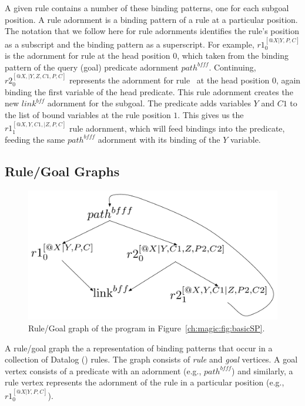 A given rule contains a number of these binding patterns, one for each subgoal
position.  A rule adornment is a binding pattern of a rule at a particular
position.  The notation that we follow here for rule adornments identifies the
rule's position as a subscript and the binding pattern as a superscript.  For
example, $r1_0^{[@X|Y,P,C]}$ is the adornment for rule  at the head
position $0$, which taken from the binding pattern of the query (goal)
predicate adornment $path^{bfff}$.  Continuing, $r2_0^{[@X,|Y,Z,C1,P,C]}$
represents the adornment for rule~ at the head position $0$, again
binding the first variable of the head predicate.  This rule adornment creates
the new $link^{bff}$ adornment for the  subgoal.  The 
predicate adds variables $Y$ and $C1$ to the list of bound variables at the
rule position $1$.  This gives us the $r1_1^{[@X,Y,C1,|Z,P,C]}$ rule adornment,
which will feed bindings into the  predicate, feeding the same
$path^{bfff}$ adornment with its binding of the $Y$ variable.

\subsection{Rule/Goal Graphs}

\begin{figure}[!t]
\begin{center}
\includegraphics[scale=0.5]{figures/RuleGoalGraph}
\caption{\label{ch:magic:fig:rggraph}Rule/Goal graph of the program in Figure~\ref{ch:magic:fig:basicSP}.}
\end{center}
\end{figure}

A rule/goal graph the a representation of binding patterns that occur in a
collection of Datalog (\OVERLOG) rules.  The graph consists of \emph{rule} and
\emph{goal} vertices.  A goal vertex consists of a predicate with an adornment
(e.g., $path^{bfff}$) and similarly, a rule vertex represents the adornment of
the rule in a particular position (e.g., $r1_0^{[@X|Y,P,C]}$).

